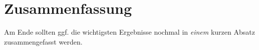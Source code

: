 
\section{Zusammenfassung}
\label{ch:Analyse:sec:zusammenfassung}

Am Ende sollten ggf. die wichtigsten Ergebnisse nochmal in \emph{einem}
kurzen Absatz zusammengefasst werden.




